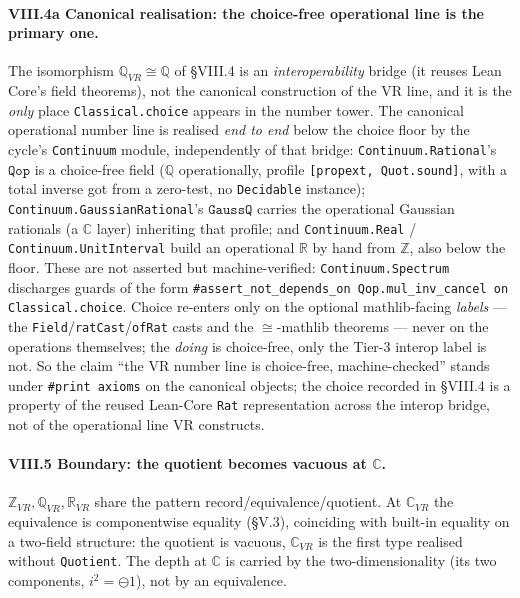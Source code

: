 \documentclass[11pt]{article}
\theoremstyle{definition}
\newcommand{\Z}{\mathbb{Z}}
\newcommand{\Q}{\mathbb{Q}}
\newcommand{\R}{\mathbb{R}}
\newcommand{\C}{\mathbb{C}}
\newcommand{\isub}{\ominus}              %
\begin{document}
\paragraph{VIII.4a Canonical realisation: the choice-free operational line is the primary one.}
The isomorphism $\Q_{VR}\cong\Q$ of \S VIII.4 is an \emph{interoperability} bridge (it reuses Lean
Core's field theorems), not the canonical construction of the VR line, and it is the \emph{only} place
\texttt{Classical.choice} appears in the number tower. The canonical operational number line is realised
\emph{end to end} below the choice floor by the cycle's \texttt{Continuum} module, independently of that
bridge: \texttt{Continuum.Rational}'s $\mathtt{Qop}$ is a choice-free field ($\Q$ operationally, profile
\texttt{[propext, Quot.sound]}, with a total inverse got from a zero-test, no \texttt{Decidable}
instance); \texttt{Continuum.GaussianRational}'s $\mathtt{GaussQ}$ carries the operational Gaussian
rationals (a $\C$ layer) inheriting that profile; and \texttt{Continuum.Real} / \texttt{Continuum.UnitInterval}
build an operational $\R$ by hand from $\Z$, also below the floor. These are not asserted but
machine-verified: \texttt{Continuum.Spectrum} discharges guards of the form
\texttt{\#assert\_not\_depends\_on Qop.mul\_inv\_cancel on Classical.choice}. Choice re-enters only on the
optional mathlib-facing \emph{labels} --- the \texttt{Field}/\texttt{ratCast}/\texttt{ofRat} casts and the
$\cong$-mathlib theorems --- never on the operations themselves; the \emph{doing} is choice-free, only the
Tier-3 interop label is not. So the claim ``the VR number line is choice-free, machine-checked'' stands
under \texttt{\#print axioms} on the canonical objects; the choice recorded in \S VIII.4 is a property of
the reused Lean-Core \texttt{Rat} representation across the interop bridge, not of the operational line VR
constructs.

\paragraph{VIII.5 Boundary: the quotient becomes vacuous at $\C$.} $\Z_{VR},\Q_{VR},\R_{VR}$
share the pattern record/equivalence/quotient. At $\C_{VR}$ the equivalence is componentwise
equality (\S V.3), coinciding with built-in equality on a two-field structure: the quotient is vacuous,
$\C_{VR}$ is the first type realised without \texttt{Quotient}. The depth at $\C$ is carried by the
two-dimensionality (its two components, $i^2=\isub 1$), not by an equivalence.
\end{document}
